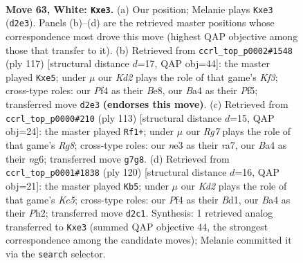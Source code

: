 \documentclass[11pt]{article}
\begin{document}
\clearpage

\begin{figure}[p]\centering
\begin{subfigure}{0.46\textwidth}\centering
\resizebox{\linewidth}{!}{%
\newchessgame
\chessboard[
  setfen={8/1kp3R1/8/5p2/B4P2/4n3/3K3P/8 w - - 0 63},
  showmover=false,
  pgfstyle=straightmove, color=movearrow, markmove={d2-e3}
]}
\caption{}
\end{subfigure}\hfill
\begin{subfigure}{0.46\textwidth}\centering
\resizebox{\linewidth}{!}{%
\newchessgame
\chessboard[
  setfen={4b3/8/5k1p/4Np2/7P/1r3PK1/2R5/8 b - - 13 59},
  showmover=false,
  pgfstyle=straightmove, color=movearrow, markmove={f6-e5}
]}
\caption{}
\end{subfigure}
\\[4pt]
\begin{subfigure}{0.46\textwidth}\centering
\resizebox{\linewidth}{!}{%
\newchessgame
\chessboard[
  setfen={8/R7/3k2N1/6P1/1p3K1p/8/P7/6r1 b - - 0 57},
  showmover=false,
  pgfstyle=straightmove, color=movearrow, markmove={g1-f1}
]}
\caption{}
\end{subfigure}\hfill
\begin{subfigure}{0.46\textwidth}\centering
\resizebox{\linewidth}{!}{%
\newchessgame
\chessboard[
  setfen={8/2k5/2n5/p1K5/7p/8/7P/3B4 w - - 0 61},
  showmover=false,
  pgfstyle=straightmove, color=movearrow, markmove={c5-b5}
]}
\caption{}
\end{subfigure}
\caption{\textbf{Move 63, White: \texttt{Kxe3}.} (a) Our position; Melanie plays \texttt{Kxe3} (\texttt{d2e3}). Panels (b)--(d) are the retrieved master positions whose correspondence most drove this move (highest QAP objective among those that transfer to it). (b) Retrieved from \texttt{ccrl\_top\_p0002\#1548} (ply 117) [structural distance $d$=17, QAP obj=44]: the master played \texttt{Kxe5}; under $\mu$ our \emph{Kd2} plays the role of that game's \emph{Kf3}; cross-type roles: our \emph{P}f4 as their \emph{B}e8, our \emph{B}a4 as their \emph{P}f5; transferred move \texttt{d2e3} \textbf{(endorses this move)}. (c) Retrieved from \texttt{ccrl\_top\_p0000\#210} (ply 113) [structural distance $d$=15, QAP obj=24]: the master played \texttt{Rf1+}; under $\mu$ our \emph{Rg7} plays the role of that game's \emph{Rg8}; cross-type roles: our \emph{n}e3 as their \emph{r}a7, our \emph{B}a4 as their \emph{n}g6; transferred move \texttt{g7g8}. (d) Retrieved from \texttt{ccrl\_top\_p0001\#1838} (ply 120) [structural distance $d$=16, QAP obj=21]: the master played \texttt{Kb5}; under $\mu$ our \emph{Kd2} plays the role of that game's \emph{Kc5}; cross-type roles: our \emph{P}f4 as their \emph{B}d1, our \emph{B}a4 as their \emph{P}h2; transferred move \texttt{d2c1}. Synthesis: 1 retrieved analog transferred to \texttt{Kxe3} (summed QAP objective 44, the strongest correspondence among the candidate moves); Melanie committed it via the \texttt{search} selector.}
\label{fig:thought-m124}
\end{figure}
\end{document}
